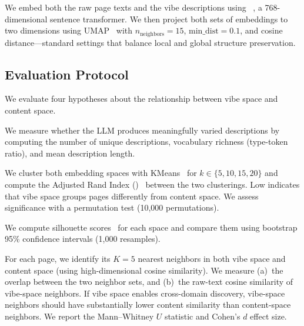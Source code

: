 We embed both the raw page texts and the vibe descriptions using \mpnet~\cite{reimers2019sentence}, a 768-dimensional sentence transformer.
We then project both sets of embeddings to two dimensions using UMAP~\cite{mcinnes2018umap} with $n_{\text{neighbors}}{=}15$, $\text{min\_dist}{=}0.1$, and cosine distance---standard settings that balance local and global structure preservation.

\subsection{Evaluation Protocol}
\label{sec:eval}

We evaluate four hypotheses about the relationship between vibe space and content space.

We measure whether the LLM produces meaningfully varied descriptions by computing the number of unique descriptions, vocabulary richness (type-token ratio), and mean description length.

We cluster both embedding spaces with KMeans~\cite{arthur2007kmeans} for $k \in \{5, 10, 15, 20\}$ and compute the Adjusted Rand Index (\ari)~\cite{hubert1985ari} between the two clusterings.
Low \ari indicates that vibe space groups pages differently from content space.
We assess significance with a permutation test (10{,}000 permutations).

We compute silhouette scores~\cite{rousseeuw1987silhouettes} for each space and compare them using bootstrap 95\% confidence intervals (1{,}000 resamples).

For each page, we identify its $K{=}5$ nearest neighbors in both vibe space and content space (using high-dimensional cosine similarity).
We measure (a)~the overlap between the two neighbor sets, and (b)~the raw-text cosine similarity of vibe-space neighbors.
If vibe space enables cross-domain discovery, vibe-space neighbors should have substantially lower content similarity than content-space neighbors.
We report the Mann--Whitney $U$ statistic and Cohen's $d$ effect size.
